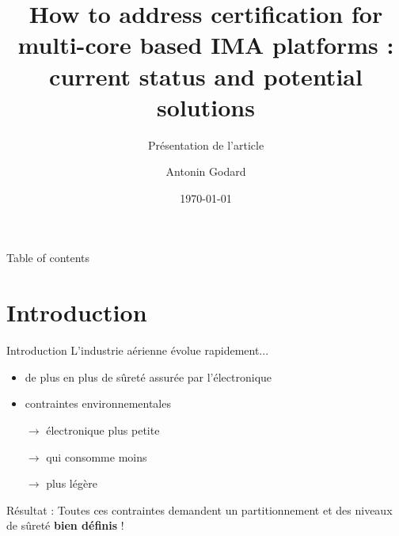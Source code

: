 \documentclass{beamer}
\begin{document}
\title[How to address certification for multi-core based IMA platforms :
       current status and potential solutions]{How to address certification for multi-core based IMA platforms :
       current status and potential solutions} 
\subtitle{\vspace{1em} Présentation de l'article}
\author{ \vspace{2em} Antonin Godard} 
\date{\today} 

\begin{frame}[plain]
  \titlepage
\end{frame}


\begin{frame}{Table of contents}
  \tableofcontents
\end{frame}

\section{Introduction}%
\label{sec:introduction}


\begin{frame}{Introduction}
	L'industrie aérienne évolue rapidement...	
	\begin{itemize}
		\item de plus en plus de sûreté assurée par l'électronique
		\item contraintes environnementales
		\item[$\rightarrow$] électronique plus petite
		\item[$\rightarrow$] qui consomme moins
		\item[$\rightarrow$] plus légère
	\end{itemize}
	
	\begin{alertblock}{Résultat :}
		Toutes ces contraintes demandent un partitionnement et des niveaux de sûreté
		\textbf{bien définis} !
	\end{alertblock}

\end{frame}
\end{document}
